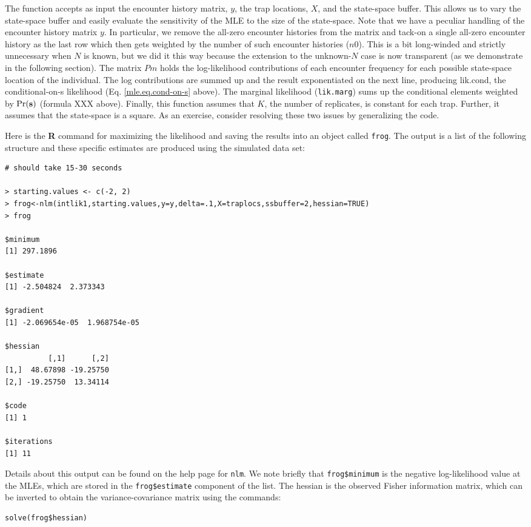 The function accepts as
input the encounter history matrix, $y$, the trap locations, $X$, and the
state-space buffer. This allows us to vary the state-space buffer and
easily evaluate the sensitivity of the MLE to the size of the
state-space. 
Note that we have a peculiar handling of the encounter history
matrix $y$. In particular, we remove the all-zero encounter histories
from the matrix and tack-on a single all-zero encounter history as the
last row which then gets weighted by the number of such encounter
histories ($n0$). This is a bit long-winded and strictly unnecessary
when $N$ is known, but we did it this way because the extension to the
unknown-$N$ case is now transparent (as we demonstrate in the following
section). 
 The matrix $Pm$ holds the log-likelihood contributions of
each encounter frequency for each possible state-space location of the
individual. 
The log contributions are summed up and the result
exponentiated on the next line, producing lik.cond, the
conditional-on-s likelihood (Eq. \ref{mle.eq.cond-on-s}
above). The marginal
likelihood (\mbox{\tt lik.marg}) sums up the conditional elements weighted by
$\Pr({\bf s})$ (formula XXX above).
Finally, this function assumes that $K$, the number
of replicates, is constant for each trap. Further, it assumes that the
state-space is a square. As an exercise, consider resolving these two
issues by generalizing the code.

Here is the {\bf R} command for maximizing the likelihood and saving the
results into an object called \mbox{\tt frog}.  The output is a list of the
following structure and these specific estimates are produced using
the simulated data set:

{\small 
\begin{verbatim}
# should take 15-30 seconds

> starting.values <- c(-2, 2) 
> frog<-nlm(intlik1,starting.values,y=y,delta=.1,X=traplocs,ssbuffer=2,hessian=TRUE)
> frog

$minimum
[1] 297.1896

$estimate
[1] -2.504824  2.373343

$gradient
[1] -2.069654e-05  1.968754e-05

$hessian
          [,1]      [,2]
[1,]  48.67898 -19.25750
[2,] -19.25750  13.34114

$code
[1] 1

$iterations
[1] 11
\end{verbatim}
} 
Details about this output can be found on the help page for
\mbox{\tt nlm}. We note briefly that \mbox{\tt frog\$minimum} is the
negative log-likelihood value at the MLEs, which are stored in the
\mbox{\tt frog\$estimate} component of the list. The hessian is the
observed Fisher information matrix, which can be inverted to obtain
the variance-covariance matrix using the commands:
\begin{verbatim}
solve(frog$hessian)
\end{verbatim}


